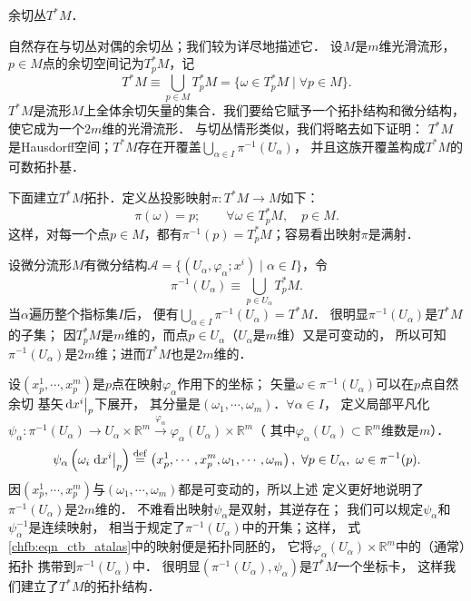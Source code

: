 \begin{example}\label{chfb:exm_ctb}
    余切丛$T^* M$．
\end{example}
自然存在与切丛对偶的余切丛；我们较为详尽地描述它．
设$M$是$m$维光滑流形，$p\in M$点的余切空间记为$T_p^* M$，记
\begin{equation}\label{chfb:eqn_cotangent-bundle-set}
    T^* M \equiv \bigcup _{p\in M} T_p^* M = \{\omega \in T_p^* M \mid \forall p\in M\} .
\end{equation}
$T^*M$是流形$M$上全体余切矢量的集合．我们要给它赋予一个拓扑结构和微分结构，使它成为一个$2m$维的光滑流形．
与切丛情形类似，我们将略去如下证明：
$T^*M$是Hausdorff空间；$T^*M$存在开覆盖$\bigcup _{\alpha\in I} \pi^{-1} (U_\alpha)$，
并且这族开覆盖构成$T^*M$的可数拓扑基．

下面建立$T^*M$拓扑．定义丛投影映射$\pi:T^*M\to M$如下：
\begin{equation*}
    \pi(\omega) = p; \qquad \forall \omega \in T_p^* M,\quad p\in M.
\end{equation*}
这样，对每一个点$p\in M$，都有$\pi^{-1}(p)=T_p^* M$；容易看出映射$\pi$是满射．

设微分流形$M$有微分结构$\mathscr{A}=\{(U_\alpha,\varphi_\alpha;x^i)\mid\alpha \in I \}$，令
\begin{equation*}
    \pi^{-1} (U_\alpha) \equiv \bigcup _{p\in U_\alpha} T_p^*M .
\end{equation*}
当$\alpha$遍历整个指标集$I$后，
便有$\bigcup _{\alpha \in I}  \pi^{-1} (U_\alpha) = T^*M$．
很明显$\pi^{-1} (U_\alpha)$是$T^*M$的子集；
因$T^*_pM$是$m$维的，而点$p\in U_\alpha$（$U_\alpha$是$m$维）又是可变动的，
所以可知$\pi^{-1} (U_\alpha)$是$2m$维；进而$T^*M$也是$2m$维的．


设$(x_p^1,\cdots,x_p^m)$是$p$点在映射$\varphi_\alpha$作用下的坐标；
矢量$\omega \in \pi^{-1} (U_\alpha)$可以在$p$点自然余切
基矢$\left.{\rm d}x^i \right | _p$下展开，
其分量是$(\omega_1,\cdots,\omega_m)$．$\forall \alpha \in I$，
定义局部平凡化$\psi_\alpha: \pi^{-1} (U_\alpha) \to U_\alpha \times \mathbb{R}^m 
\overset{\varphi_\alpha}{\longrightarrow} \varphi_\alpha(U_\alpha) \times \mathbb{R}^m $（
其中$\varphi_\alpha(U_\alpha) \subset \mathbb{R}^m$维数是$m$）．
\begin{equation}\label{chfb:eqn_ctb_atalas}
    \psi_\alpha\left(\omega_i \left. {\rm d}x^i \right| _p \right) \overset{\mathrm {def}}{=} 
    \left(x_p^1,\cdots,x_p^m, \omega_1,\cdots,\omega_m\right),
    \ \forall p\in U_\alpha,\ \omega\in \pi^{-1} (p).
\end{equation}
因$(x_p^1,\cdots,x_p^m)$与$(\omega_1,\cdots,\omega_m)$都是可变动的，所以上述
定义更好地说明了$\pi^{-1} (U_\alpha)$是$2m$维的．
不难看出映射$\psi_\alpha$是双射，其逆存在；
我们可以规定$\psi_\alpha$和$\psi_\alpha^{-1}$是连续映射，
相当于规定了$\pi^{-1} (U_\alpha)$中的开集；这样，
式\eqref{chfb:eqn_ctb_atalas}中的映射便是拓扑同胚的，
它将$\varphi_\alpha(U_\alpha) \times \mathbb{R}^m $中的（通常）拓扑
携带到$\pi^{-1} (U_\alpha)$中．
很明显$(\pi^{-1} (U_\alpha),\psi_\alpha)$是$T^*M$一个坐标卡，
这样我们建立了$T^*M$的拓扑结构．


